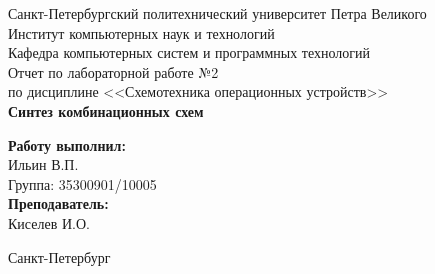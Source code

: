 \begin{titlepage}
    \begin{center}
        \large Санкт-Петербургский политехнический университет Петра Великого\\
        \large Институт компьютерных наук и технологий \\
        \large Кафедра компьютерных систем и программных технологий\\[6cm]


        \huge Отчет по лабораторной работе №2\\[0.5cm]
        \large по дисциплине <<Схемотехника операционных устройств>>\\[0.1cm]
        \large\textbf{Синтез комбинационных схем}\\[5cm]
    \end{center}


    \begin{flushright}
        \begin{minipage}{0.25\textwidth}
            \begin{flushleft}

                \large\textbf{Работу выполнил:}\\
                \large Ильин В.П.\\
                \large {Группа:} 35300901/10005\\

                \large \textbf{Преподаватель:}\\
                \large Киселев И.О.

            \end{flushleft}
        \end{minipage}
    \end{flushright}

    \vfill

    \begin{center}
        \large Санкт-Петербург\\
        \large \the\year
    \end{center}
\end{titlepage}

\vfill
\newpage